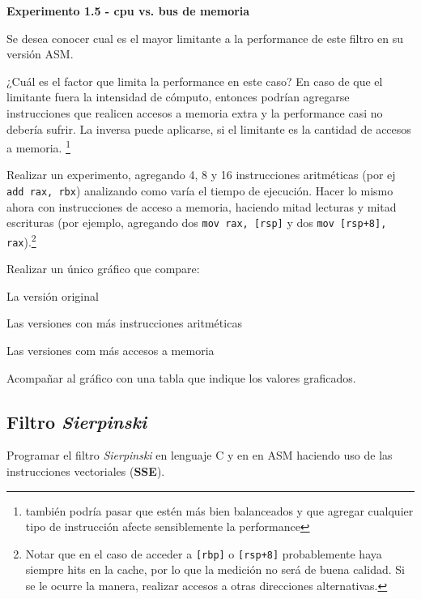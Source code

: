 \vspace*{0.3cm} \noindent
\textbf{Experimento 1.5 - cpu vs. bus de memoria}

Se desea conocer cual es el mayor limitante a la
performance de este filtro en su versión ASM.

¿Cuál es el factor que limita la performance en este caso?
En caso de que el limitante fuera la intensidad de cómputo, entonces 
podrían agregarse instrucciones que realicen accesos a memoria extra y la
performance casi no debería sufrir. 
La inversa puede aplicarse, si el limitante es la cantidad de accesos a memoria.
\footnote{también podría pasar que estén más bien balanceados y que agregar
cualquier tipo de instrucción afecte sensiblemente la performance}
	
Realizar un experimento, agregando 4, 8 y 16 instrucciones aritméticas 
(por ej \verb|add rax, rbx|) analizando como varía el tiempo de ejecución.
Hacer lo mismo ahora con instrucciones de acceso a memoria, haciendo 
mitad lecturas y mitad escrituras (por ejemplo, agregando dos 
\verb|mov rax, [rsp]| y dos \verb|mov [rsp+8], rax|).\footnote{Notar que en el caso de acceder a \texttt{[rbp]} o \texttt{[rsp+8]} probablemente haya siempre hits en la cache, por lo que la medición no será de buena calidad. Si se le ocurre la manera, realizar accesos a otras direcciones alternativas.}
	
Realizar un único gráfico que compare:
\begin{inparaenum}
    \item La versión original
    \item Las versiones con más instrucciones aritméticas
    \item Las versiones com más accesos a memoria
\end{inparaenum}

Acompañar al gráfico con una tabla que indique los valores graficados.  
  

\subsection{Filtro \textit{Sierpinski}}

Programar el filtro \textit{Sierpinski} en lenguaje C y en en ASM haciendo 
uso de las instrucciones vectoriales (\textbf{SSE}).

